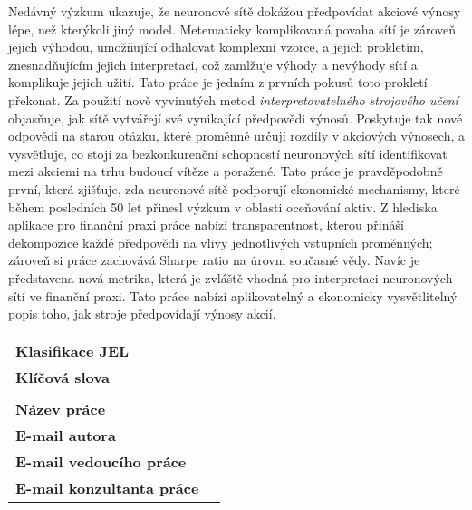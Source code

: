 Nedávný výzkum ukazuje, \v{z}e neuronové sít\v{e} doká\v{z}ou p\v{r}edpovídat akciové výnosy lépe, ne\v{z} kterýkoli jiný model. Metematicky komplikovaná povaha sítí je zárove\v{n} jejich výhodou, umo\v{z}\v{n}ující odhalovat komplexní vzorce, a jejich prokletím, znesnad\v{n}ujícím jejich interpretaci, co\v{z} zaml\v{z}uje výhody a nevýhody sítí a komplikuje jejich u\v{z}ití. Tato práce je jedním z prvních pokus\r{u} toto prokletí p\v{r}ekonat. Za pou\v{z}ití nov\v{e} vyvinutých metod \textit{interpretovatelného strojového u\v{c}ení} objas\v{n}uje, jak sít\v{e} vytvá\v{r}ejí své vynikající p\v{r}edpov\v{e}di výnos\r{u}. Poskytuje tak nové odpov\v{e}di na starou otázku, které prom\v{e}nn\'{e} ur\v{c}ují rozd\'{i}ly v akciov\'{y}ch v\'{y}nosech, a vysv\v{e}tluje, co stoj\'{i} za bezkonkuren\v{c}n\'{i} schopnost\'{i} neuronov\'{y}ch s\'{i}t\'{i} identifikovat mezi akciemi na trhu budouc\'{i} v\'{i}t\v{e}ze a pora\v{z}en\'{e}. Tato práce je pravd\v{e}podobn\v{e} první, která zji\v{s}\v{t}uje, zda neuronové sít\v{e} podporují ekonomické mechanismy, které b\v{e}hem posledních 50 let p\v{r}inesl výzkum v oblasti oce\v{n}ování aktiv. Z hlediska aplikace pro finan\v{c}ní praxi práce nabízí transparentnost, kterou p\v{r}iná\v{s}í dekompozice ka\v{z}d\'{e} p\v{r}edpov\v{e}di na vlivy jednotliv\'{y}ch vstupn\'{i}ch prom\v{e}nn\'{y}ch; zárove\v{n} si práce zachovává Sharpe ratio na úrovni sou\v{c}asné v\v{e}dy. Nav\'{i}c je p\v{r}edstavena nov\'{a} metrika, kter\'{a} je zvl\'{a}\v{s}t\v{e} vhodn\'{a} pro interpretaci neuronov\'{y}ch s\'{i}t\'{i} ve finan\v{c}n\'{i} praxi. Tato pr\'{a}ce nab\'{i}z\'{i} aplikovateln\'{y} a ekonomicky vysv\v{e}tliteln\'{y} popis toho, jak stroje p\v{r}edpov\'{i}daj\'{i} v\'{y}nosy akci\'{i}.
 
\bigskip

\begin{tabular}{lp{7.7cm}}
		\textbf{Klasifikace JEL} & \JEL \\
		\textbf{Kl\'{i}\v{c}ov\'{a} slova} & \Klic \\
 		& \\
		\textbf{N\'{a}zev pr\'{a}ce} & \BooknameCZ \\
 		\textbf{E-mail autora} & \texttt{\href{mailto:\Email}{\Email}}\\
		\textbf{E-mail vedouc\'{i}ho pr\'{a}ce} & \texttt{\href{mailto:\EmailSup}{\EmailSup}}\\
		\textbf{E-mail konzultanta pr\'{a}ce} & \texttt{\href{mailto:\EmailCon}{\EmailCon}}\\
\end{tabular}


